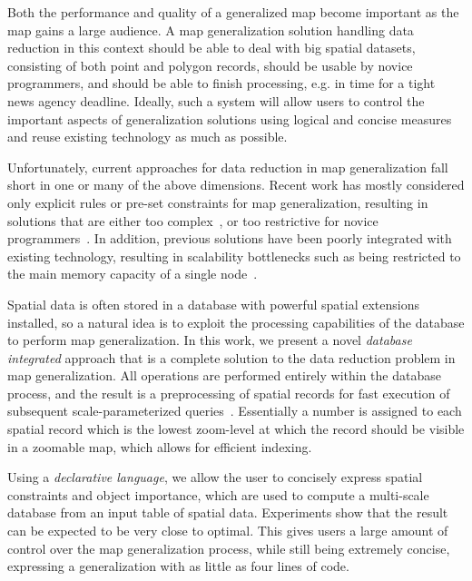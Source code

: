 Both the performance and quality of a generalized map become important as the map gains a large audience. A map generalization solution handling data reduction in this context should be able to deal with big spatial datasets, consisting of both point and polygon records, should be usable by novice programmers, and should be able to finish processing, e.g. in time for a tight news agency deadline. Ideally, such a system will allow users to control the important aspects of generalization solutions using logical and concise measures and reuse existing technology as much as possible.

Unfortunately, current approaches for data reduction in map generalization fall short in one or many of the above dimensions. Recent work has mostly considered only explicit rules or pre-set constraints for map generalization, resulting in solutions that are either too complex~\cite{sld,mapnik}, or too restrictive for novice programmers~\cite{nutanong2012multiresolution,sarma2012fusiontables}. In addition, previous solutions have been poorly integrated with existing technology, resulting in scalability bottlenecks such as being restricted to the main memory capacity of a single node~\cite{sarma2012fusiontables}. 

Spatial data is often stored in a database with powerful spatial extensions installed, so a natural idea is to exploit the processing capabilities of the database to perform map generalization. In this work, we present a novel \emph{database integrated} approach that is a complete solution to the data reduction problem in map generalization. All operations are performed entirely within the database process, and the result is a preprocessing of spatial records for fast execution of subsequent scale-parameterized queries~\cite{hilbert1891ueber}. Essentially a number is assigned to each spatial record which is the lowest zoom-level at which the record should be visible in a zoomable map, which allows for efficient indexing.

Using a \emph{declarative language}, we allow the user to concisely express spatial constraints and object importance, which are used to compute a multi-scale database from an input table of spatial data. Experiments show that the result can be expected to be very close to optimal. This gives users a large amount of control over the map generalization process, while still being extremely concise, expressing a generalization with as little as four lines of code.

